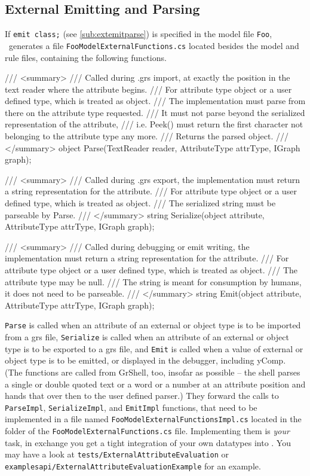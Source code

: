 \subsection*{External Emitting and Parsing}\label{sub:apiextemitparse}
If \texttt{emit class;} (see \ref{sub:extemitparse}) is specified in the model file \texttt{Foo}, \GrG~generates a file \texttt{FooModelExternalFunctions.cs} located besides the model and rule files,
containing the following functions.

\begin{csharplet}
/// <summary>
/// Called during .grs import, at exactly the position in the text reader where the attribute begins.
/// For attribute type object or a user defined type, which is treated as object.
/// The implementation must parse from there on the attribute type requested.
/// It must not parse beyond the serialized representation of the attribute, 
/// i.e. Peek() must return the first character not belonging to the attribute type any more.
/// Returns the parsed object.
/// </summary>
object Parse(TextReader reader, AttributeType attrType, IGraph graph);

/// <summary>
/// Called during .grs export, the implementation must return a string representation for the attribute.
/// For attribute type object or a user defined type, which is treated as object.
/// The serialized string must be parseable by Parse.
/// </summary>
string Serialize(object attribute, AttributeType attrType, IGraph graph);

/// <summary>
/// Called during debugging or emit writing, the implementation must return a string representation for the attribute.
/// For attribute type object or a user defined type, which is treated as object.
/// The attribute type may be null.
/// The string is meant for consumption by humans, it does not need to be parseable.
/// </summary>
string Emit(object attribute, AttributeType attrType, IGraph graph);
\end{csharplet}

\texttt{Parse} is called when an attribute of an external or object type is to be imported from a grs file, \texttt{Serialize} is called when an attribute of an external or object type is to be exported to a grs file, and \texttt{Emit} is called when a value of external or object type is to be emitted, or displayed in the debugger, including yComp.
(The functions are called from GrShell, too, insofar as possible -- the shell parses a single or double quoted text or a word or a number at an attribute position and hands that over then to the user defined parser.)
They forward the calls to \texttt{ParseImpl}, \texttt{SerializeImpl}, and \texttt{EmitImpl} functions, that need to be implemented in a file named \texttt{FooModelExternal\-FunctionsImpl.cs} located in the folder of the \texttt{FooModelExternalFunctions.cs} file.
Implementing them is \emph{your} task, in exchange you get a tight integration of your own datatypes into \GrG.
You may have a look at \texttt{tests/ExternalAttributeEvaluation} or  \texttt{examples\-api/ExternalAttributeEvaluationExample} for an example.


